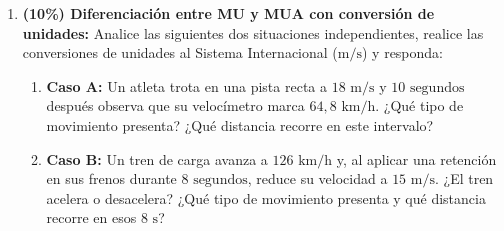 \documentclass[11pt, letterpaper]{article}
\newif\ifmostrarrespuestas
\newcommand{\respuesta}[1]{
	\ifmostrarrespuestas
	\par\vspace{0.2cm}
	\begin{tcolorbox}[colback=blue!5!white, colframe=valblue, coltext=blue!80!black, boxrule=0.5pt, arc=1mm, left=2mm, right=2mm, top=1.5mm, bottom=1.5mm]
		\footnotesize \textbf{\textcolor{valblue}{Solución Paso a Paso (Docente):}} #1
	\end{tcolorbox}
	\vspace{0.2cm}
	\fi
}
\begin{document}
	\begin{enumerate}[leftmargin=*, itemsep=0.6cm]
		
		\item \textbf{(10\%) Diferenciación entre MU y MUA con conversión de unidades:} Analice las siguientes dos situaciones independientes, realice las conversiones de unidades al Sistema Internacional ($\text{m/s}$) y responda:
		\begin{enumerate}[label=\alph*., itemsep=0.2cm]
			\item \textbf{Caso A:} Un atleta trota en una pista recta a $18\text{ m/s}$ y $10\text{ segundos}$ después observa que su velocímetro marca $64,8\text{ km/h}$. ¿Qué tipo de movimiento presenta? ¿Qué distancia recorre en este intervalo?
			\item \textbf{Caso B:} Un tren de carga avanza a $126\text{ km/h}$ y, al aplicar una retención en sus frenos durante $8\text{ segundos}$, reduce su velocidad a $15\text{ m/s}$. ¿El tren acelera o desacelera? ¿Qué tipo de movimiento presenta y qué distancia recorre en esos $8\text{ s}$?
		\end{enumerate}
		\respuesta{
			\textbf{a) Caso A:} Convertimos $64,8\text{ km/h}$ a $\text{m/s}$: $64,8 \times \frac{1000}{3600} = 18\text{ m/s}$. Como $v_0 = 18\text{ m/s}$ y $v_f = 18\text{ m/s}$, la velocidad se mantiene constante ($a = 0\text{ m/s}^2$), por tanto presenta un \textbf{Movimiento Uniforme (MU)}. Con la ec. (2.I): $d = v \cdot t = (18\text{ m/s})(10\text{ s}) = \mathbf{180}\text{ \textbf{m}}$.\\[0.1cm]
			\textbf{b) Caso B:} Convertimos $126\text{ km/h}$ a $\text{m/s}$: $v_0 = 35\text{ m/s}$. Al pasar de $35\text{ m/s}$ a $15\text{ m/s}$ en $t = 8\text{ s}$, su velocidad disminuye (\textbf{desacelera}), presentando un \textbf{Movimiento Uniforme Desacelerado $\text{MUA}(-)$}.\\
			Aceleración con ec. (2.II): $a = \frac{15 - 35}{8} = \frac{-20}{8} = \mathbf{-2,5}\text{ \textbf{m/s}}^\mathbf{2}$.\\
			Distancia con ec. (2.III): $x = (35\text{ m/s})(8\text{ s}) + \frac{(-2,5\text{ m/s}^2)(8\text{ s})^2}{2} = 280 - 80 = \mathbf{200}\text{ \textbf{m}}$.
		}
		

\end{enumerate}
\end{document}
